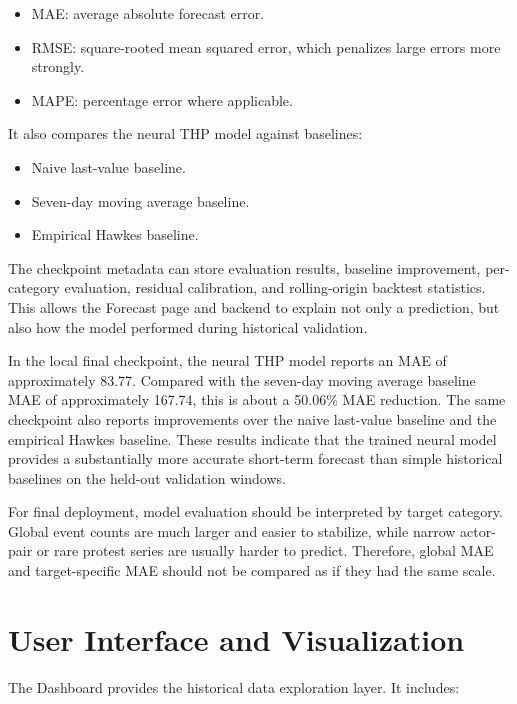 \documentclass[11pt]{article}
\begin{document}
\begin{itemize}
    \item MAE: average absolute forecast error.
    \item RMSE: square-rooted mean squared error, which penalizes large errors more strongly.
    \item MAPE: percentage error where applicable.
\end{itemize}

It also compares the neural THP model against baselines:

\begin{itemize}
    \item Naive last-value baseline.
    \item Seven-day moving average baseline.
    \item Empirical Hawkes baseline.
\end{itemize}

The checkpoint metadata can store evaluation results, baseline improvement, per-category evaluation, residual calibration, and rolling-origin backtest statistics. This allows the Forecast page and backend to explain not only a prediction, but also how the model performed during historical validation.

In the local final checkpoint, the neural THP model reports an MAE of approximately 83.77. Compared with the seven-day moving average baseline MAE of approximately 167.74, this is about a 50.06\% MAE reduction. The same checkpoint also reports improvements over the naive last-value baseline and the empirical Hawkes baseline. These results indicate that the trained neural model provides a substantially more accurate short-term forecast than simple historical baselines on the held-out validation windows.

For final deployment, model evaluation should be interpreted by target category. Global event counts are much larger and easier to stabilize, while narrow actor-pair or rare protest series are usually harder to predict. Therefore, global MAE and target-specific MAE should not be compared as if they had the same scale.

\section{User Interface and Visualization}

The Dashboard provides the historical data exploration layer. It includes:
\end{document}
